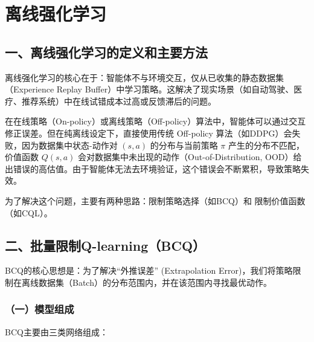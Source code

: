\setcounter{section}{2}

\hypertarget{ux79bbux7ebfux5f3aux5316ux5b66ux4e60}{%
\section{离线强化学习}\label{ux79bbux7ebfux5f3aux5316ux5b66ux4e60}}

\hypertarget{ux4e00ux79bbux7ebfux5f3aux5316ux5b66ux4e60ux7684ux5b9aux4e49ux548cux4e3bux8981ux65b9ux6cd5}{%
\subsection{一、离线强化学习的定义和主要方法}\label{ux4e00ux79bbux7ebfux5f3aux5316ux5b66ux4e60ux7684ux5b9aux4e49ux548cux4e3bux8981ux65b9ux6cd5}}

离线强化学习的核心在于：智能体不与环境交互，仅从已收集的静态数据集（Experience Replay Buffer）中学习策略。这解决了现实场景（如自动驾驶、医疗、推荐系统）中在线试错成本过高或反馈滞后的问题。

在在线策略（On-policy）或离线策略（Off-policy）算法中，智能体可以通过交互修正误差。但在纯离线设定下，直接使用传统 Off-policy 算法（如DDPG）会失败，因为数据集中状态-动作对 \((s,a)\) 的分布与当前策略 \(\pi\) 产生的分布不匹配，价值函数 \(Q(s,a)\) 会对数据集中未出现的动作（Out-of-Distribution, OOD）给出错误的高估值。由于智能体无法去环境验证，这个错误会不断累积，导致策略失效。

为了解决这个问题，主要有两种思路：限制策略选择（如BCQ）和 限制价值函数（如CQL）。

\hypertarget{ux4e8cux6279ux91cfux9650ux5236q-learningbcq}{%
\subsection{二、批量限制Q-learning（BCQ）}\label{ux4e8cux6279ux91cfux9650ux5236q-learningbcq}}

BCQ的核心思想是：为了解决``外推误差'' (Extrapolation Error)，我们将策略限制在离线数据集（Batch）的分布范围内，并在该范围内寻找最优动作。

\hypertarget{ux4e00ux6a21ux578bux7ec4ux6210}{%
\subsubsection{（一）模型组成}\label{ux4e00ux6a21ux578bux7ec4ux6210}}

BCQ主要由三类网络组成：

